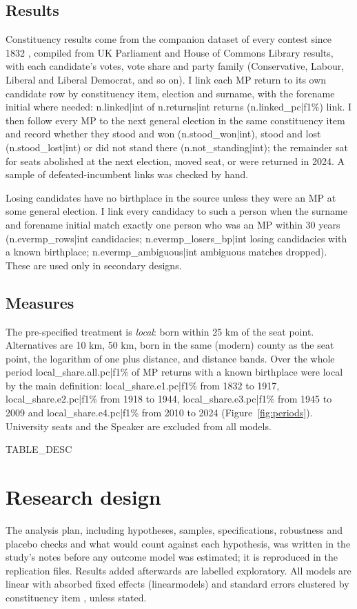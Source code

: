 \documentclass[11pt,a4paper]{article}
\begin{document}
\subsection{Results}
Constituency results come from the companion dataset of every contest since 1832 \citep{hotham2026ele}, compiled from UK Parliament and House of Commons Library results, with each candidate's votes, vote share and party family (Conservative, Labour, Liberal and Liberal Democrat, and so on). I link each MP return to its own candidate row by constituency item, election and surname, with the forename initial where needed: {{n.linked|int}} of {{n.returns|int}} returns ({{n.linked_pc|f1}}\%) link. I then follow every MP to the next general election in the same constituency item and record whether they stood and won ({{n.stood_won|int}}), stood and lost ({{n.stood_lost|int}}) or did not stand there ({{n.not_standing|int}}); the remainder sat for seats abolished at the next election, moved seat, or were returned in 2024. A sample of defeated-incumbent links was checked by hand.

Losing candidates have no birthplace in the source unless they were an MP at some general election. I link every candidacy to such a person when the surname and forename initial match exactly one person who was an MP within 30 years ({{n.evermp_rows|int}} candidacies; {{n.evermp_losers_bp|int}} losing candidacies with a known birthplace; {{n.evermp_ambiguous|int}} ambiguous matches dropped). These are used only in secondary designs.

\subsection{Measures}
The pre-specified treatment is \emph{local}: born within 25 km of the seat point. Alternatives are 10 km, 50 km, born in the same (modern) county as the seat point, the logarithm of one plus distance, and distance bands. Over the whole period {{local_share.all.pc|f1}}\% of MP returns with a known birthplace were local by the main definition: {{local_share.e1.pc|f1}}\% from 1832 to 1917, {{local_share.e2.pc|f1}}\% from 1918 to 1944, {{local_share.e3.pc|f1}}\% from 1945 to 2009 and {{local_share.e4.pc|f1}}\% from 2010 to 2024 (Figure~\ref{fig:periods}). University seats and the Speaker are excluded from all models.

{{TABLE_DESC}}

\section{Research design}
The analysis plan, including hypotheses, samples, specifications, robustness and placebo checks and what would count against each hypothesis, was written in the study's notes before any outcome model was estimated; it is reproduced in the replication files. Results added afterwards are labelled exploratory. All models are linear with absorbed fixed effects (linearmodels) and standard errors clustered by constituency item \citep{cameronmiller2015}, unless stated.
\end{document}
